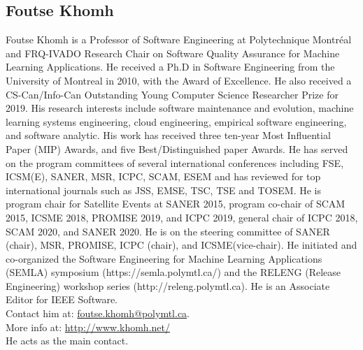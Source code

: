 \subsection{Foutse Khomh}
Foutse Khomh is a Professor of Software Engineering at Polytechnique Montréal and FRQ-IVADO Research Chair on Software Quality Assurance for Machine Learning Applications. He received a Ph.D in Software Engineering from the University of Montreal in 2010, with the Award of Excellence. He also received a CS-Can/Info-Can Outstanding Young Computer Science Researcher Prize for 2019. His research interests include software maintenance and evolution, machine learning systems engineering, cloud engineering, empirical software engineering, and software analytic. His work has received three ten-year Most Influential Paper (MIP) Awards, and five Best/Distinguished paper Awards. He has served on the program committees of several international conferences including FSE, ICSM(E), SANER, MSR, ICPC, SCAM, ESEM and has reviewed for top international journals such as JSS, EMSE, TSC, TSE and TOSEM. He is program chair for Satellite Events at SANER 2015, program co-chair of SCAM 2015, ICSME 2018, PROMISE 2019, and ICPC 2019, general chair of ICPC 2018, SCAM 2020, and SANER 2020. He is on the steering committee of SANER (chair), MSR, PROMISE, ICPC (chair), and ICSME(vice-chair). He initiated and co-organized the Software Engineering for Machine Learning Applications (SEMLA) symposium (https://semla.polymtl.ca/) and the RELENG (Release Engineering) workshop series (http://releng.polymtl.ca). He is an Associate Editor for IEEE Software.\\
Contact him at: \href{mailto:foutse.khomh@polymtl.ca}{foutse.khomh@polymtl.ca}.\\
More info at: \url{http://www.khomh.net/}\\
He acts as the main contact.
